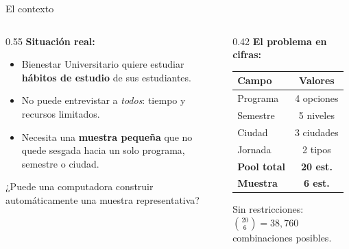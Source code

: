 \documentclass[aspectratio=169, 10pt]{beamer}
\begin{document}
\begin{frame}{El contexto}
  \begin{columns}[T]
    \begin{column}{0.55\textwidth}
      \textbf{Situación real:}
      \begin{itemize}
        \item Bienestar Universitario quiere estudiar \textbf{hábitos de estudio} de sus estudiantes.
        \item No puede entrevistar a \emph{todos}: tiempo y recursos limitados.
        \item Necesita una \textbf{muestra pequeña} que no quede sesgada hacia un solo programa, semestre o ciudad.
      \end{itemize}

      \vspace{0.4cm}
      \begin{tcolorbox}[colback=unalverde!10, colframe=unalverde, title=Pregunta central]
        ¿Puede una computadora construir automáticamente una muestra representativa?
      \end{tcolorbox}
    \end{column}
    \begin{column}{0.42\textwidth}
      \textbf{El problema en cifras:}
      \begin{center}
        \begin{tabular}{lc}
          \toprule
          \textbf{Campo} & \textbf{Valores} \\
          \midrule
          Programa  & 4 opciones \\
          Semestre  & 5 niveles  \\
          Ciudad    & 3 ciudades \\
          Jornada   & 2 tipos    \\
          \midrule
          \textbf{Pool total} & \textbf{20 est.} \\
          \textbf{Muestra} & \textbf{6 est.} \\
          \bottomrule
        \end{tabular}
      \end{center}

      \vspace{0.3cm}
      \small Sin restricciones: $\binom{20}{6} = 38{,}760$ combinaciones posibles.
    \end{column}
  \end{columns}
\end{frame}
\end{document}
